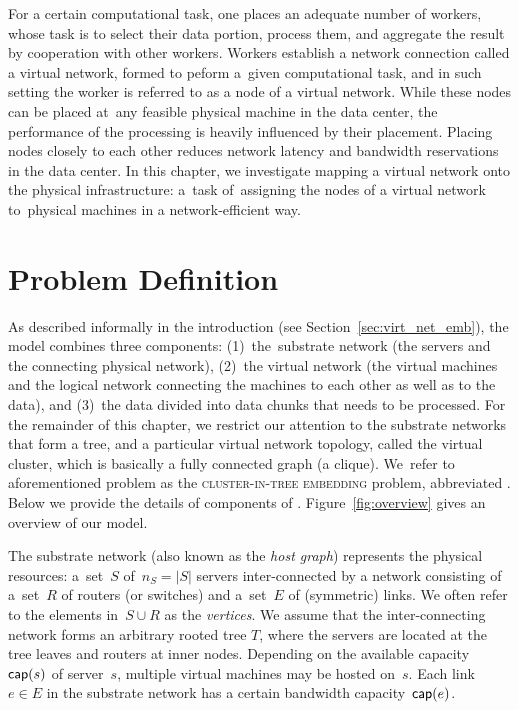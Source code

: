 
For a certain computational task, one places an adequate number of workers, whose task is to select their data portion, process them, and aggregate the result by cooperation with other workers.
Workers establish a network connection called a virtual network, formed to peform a~given computational task, and in such setting the worker is referred to as a node of a virtual network.
While these nodes can be placed at~any feasible physical machine in the data center, the performance of the processing is heavily influenced by their placement.
Placing nodes closely to each other reduces network latency and bandwidth reservations in the data center.
In this chapter, we investigate mapping a virtual network onto the physical infrastructure: a~task of~assigning the nodes of a virtual network to~physical machines in a network-efficient way.

\section{Problem Definition}\label{sec:model}

As described informally in the introduction (see Section~\ref{sec:virt_net_emb}), the model combines three components: (1)~the~substrate network (the servers
and the connecting physical network),
(2)~the virtual network (the virtual machines and the logical network connecting the machines to each other
as well as to the data), and (3)~the data divided into data chunks that needs to be processed.
For the remainder of this chapter, we restrict our attention to the substrate networks that form a tree, and a particular virtual network topology, called the virtual cluster, which is basically a fully connected graph (a clique).
We~refer to aforementioned problem as the \textsc{cluster-in-tree embedding} problem, abbreviated \CTE.
Below we provide the details of components of \CTE. Figure~\ref{fig:overview} gives an overview of our model.


 The substrate network (also known as the \emph{host graph}) represents the physical resources:
a~set~$S$ of~$n_S=|S|$ servers inter-connected by a network consisting of a~set~$R$ of routers (or switches)
and a~set~$E$ of (symmetric) links. We often refer to the elements in~$S\cup R$
as the \emph{vertices}. We assume that the inter-connecting network forms an arbitrary rooted tree $T$,
where the servers are located at the tree leaves and routers at inner nodes.
Depending on the available capacity~$\textsf{cap}(s)$ of server~$s$, multiple virtual machines may be hosted on~$s$.
Each link~$e\in E$ in the substrate network has a certain bandwidth capacity~$\textsf{cap}(e)$.


